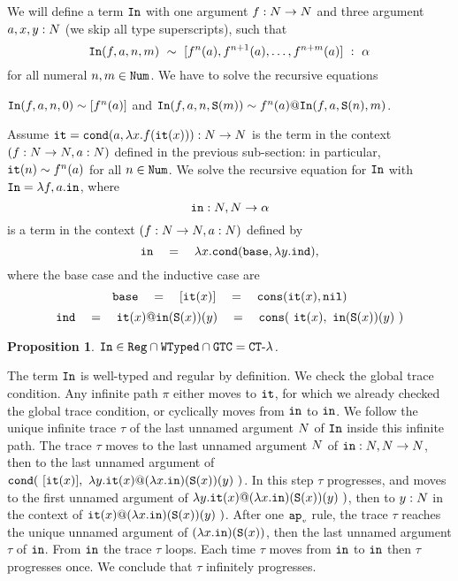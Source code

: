 \documentclass{article}
\newtheorem{proposition}[theorem]{Proposition}
\newenvironment{proof}[1][Proof]{\begin{trivlist}
\item[\hskip \labelsep {\bfseries #1}]}{\end{trivlist}}
\begin{document}
\begin{Eg}
We will define a term ${\tt In}$ with one argument $f:{N} \rightarrow {N}$ and three argument
$a,x,y:{N}$ (we skip all type superscripts), such that 
\[
{\tt In}(f,a,n,m) \  \sim \ [f^n(a), f^{n+1}(a), \ldots, f^{n+m}(a)] \  : \ \alpha
\]
for all numeral $n,m \in {\tt Num}$. 
We have to solve the recursive equations 
\begin{center}
  ${\tt In}(f,a,n,0) \sim [f^n(a)]$
  \quad
  and
  \quad
  ${\tt In}(f,a,n,{\tt S} (m))  \sim f^n(a) @ {\tt In}(f,a,{\tt S}(n),m)$.
\end{center}
Assume ${\tt it} = {\tt cond} (a, \lambda x.f({\tt it}(x))):{N} \rightarrow {N}$ is the term
in the context $(f:{N}\rightarrow{N}, a:{N})$ defined 
in the previous sub-section: in particular, ${\tt it}(n) \sim f^n(a)$ for all $n \in {\tt Num}$.
We solve the recursive equation for ${\tt In}$ with ${\tt In} = \lambda f,a.{\tt in}$,
where 
\[
{\tt in}:{N},{N} \rightarrow \alpha
\]
is a term in the context $(f:{N}\rightarrow{N}, a:{N})$ defined by 
\[
\interval 
\ \ \ = \ \ \ 
\lambda x.\cond (\base,  \lambda y.\inductive),
\]
where the base case and the inductive case are
\[
\base 
\ \ \ =\ \ \  
[\iter(x)]
\ \ \ =\ \ \ 
\cons(\iter(x),\nil)
\]
\[
\inductive 
\ \ \ = \ \ \ 
\iter(x) @ \interval(\Succ(x))(y)
\ \ \ = \ \ \  
\cons(\ \iter(x), \ \interval(\Succ(x))(y) \ )
\]
\end{Eg}

\begin{proposition}
${\tt In} \in {\tt Reg} \cap {\tt WTyped} \cap {\tt GTC} = { {\tt CT} \mbox{-} \lambda}$.
\end{proposition}

\begin{proof}
The term ${\tt In}$ is well-typed and regular by definition. We check the global trace condition.
Any infinite path $\pi$ either moves to ${\tt it}$, for which we already checked the global trace condition,
or cyclically moves from ${\tt in}$ to ${\tt in}$.
We follow the unique infinite 
trace $\tau$ of the last unnamed argument ${N}$ of ${\tt In}$ inside this infinite path.
The trace $\tau$ moves to the last unnamed argument ${N}$ of  
${\tt in}:{N},{N} \rightarrow {N}$, then to the last unnamed argument of
$\cond (\ [\iter(x)],  \  \lambda y.\iter(x) @ (\lambda x.\interval)(\Succ(x))(y) \ )$.
In this step $\tau$ progresses, and moves to 
the first unnamed argument of $\lambda y.{\tt it}(x) @ (\lambda x.{\tt in})({\tt S}(x))(y) \ )$,
then to $y:{N}$ in the context of $\iter(x) @ (\lambda x.\interval)(\Succ(x))(y) \ )$.
After one ${{\tt ap}_{\mbox{\tiny $v$}}}$ rule, the trace $\tau$ reaches the unique unnamed argument of 
$(\lambda x.{\tt in})({\tt S}(x))$, then the last unnamed argument $\tau$ of ${\tt in}$. 
From ${\tt in}$ the trace $\tau$ loops. Each time $\tau$ moves from ${\tt in}$ to ${\tt in}$
then $\tau$ progresses once. We conclude that $\tau$ infinitely progresses.
\end{proof}
\end{document}
